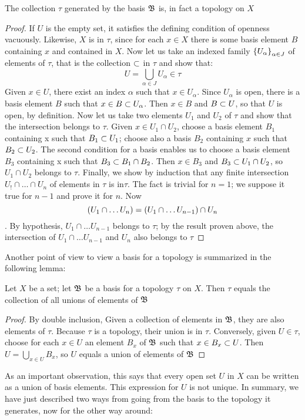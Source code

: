 \begin{lem}
	The collection $ \tau $ generated by the basis $ \mathfrak{B}$ is, in fact a topology on $X$
\end{lem}
\begin{proof}
	If $U$ is the empty set, it satisfies the defining condition of openness vacuously. Likewise, $X$ is in $\tau$, since for each $ x \in X$ there is some basis element $B$ containing $x$ and contained in $X$. Now let us take an indexed family $ \left\lbrace U_\alpha \right\rbrace_{\alpha \in J} $ of elements of $ \tau $, that is the collection $ \subset$ in $ \tau$ and show that:
	\[ U = \bigcup_{\alpha \in J} U_\alpha \in \tau \]
	Given $x \in U$, there exist an index $ \alpha $ such that $ x \in U_{\alpha} $. Since $ U_{\alpha} $ is open, there is a basis element $B$ such that $x \in B \subset U_{\alpha}$. Then $x \in B$ and $ B \subset U$, so that $U$ is open, by definition.
	Now let us take two elements $ U_1 $ and $ U_2$ of $ \tau $ and show that the intersection belongs to $ \tau $. Given $x \in U_1 \cap U_2 $, choose a basis element $B_1$ containing x such that $ B_1 \subset U_1$; choose also a basis $B_2$ containing $x$ such that $ B_2 \subset U_2$. The second condition for a basis enables us to choose a basis element $ B_3 $ containing x such that $ B_3 \subset B_1 \cap B_2$. Then $ x \in B_3$ and $ B_3 \subset U_1 \cap U_2 $, so $ U_1 \cap U_2 $ belongs to $ \tau $. Finally, we show by induction that any finite intersection $ U_! \cap \ldots \cap U_n$ of elements in $ \tau $ is in$ \tau$. The fact is trivial for $ n =1$; we suppose it true for $ n-1$ and prove it for $n$. Now
	\[ \left( U_1 \cap \ldots U_n  \right) = \left( U_1 \cap \ldots U_{n-1}  \right) \cap U_n \].
	By hypothesis, $ U_1 \cap \ldots U_{n-1} $ belongs to $ \tau $; by the result proven above, the intersection of $ U_1 \cap \ldots U_{n-1} $ and $U_n$ also belongs to $ \tau $
\end{proof}

Another point of view to view a basis for a topology is summarized in the following lemma:

\begin{lem}
	Let $X$ be a set; let $ \mathfrak{B} $ be a basis for a topology $ \tau $ on $X$. Then $ \tau $ equals the collection of all unions of elements of $ \mathfrak{B} $
\end{lem}

\begin{proof}
	By double inclusion, Given a collection of elements in $ \mathfrak{B} $, they are also elements of $ \tau $. Because $ \tau $ is a topology, their union is in $\tau$. Conversely, given $ U \in \tau $, choose for each $ x \in U$ an element $ B_x $ of $ \mathfrak{B} $ such that $ x \in B_x \subset U $. Then $ U = \bigcup_{x \in U} B_x$, so $U$ equals a union of elements of $ \mathfrak{B} $
\end{proof}
As an important observation, this says that every open set $U$ in $X$ can be written as a union of basis elements. This expression for $U$ is not unique. In summary, we have just described two ways from going from the basis to the topology it generates, now for the other way around:

